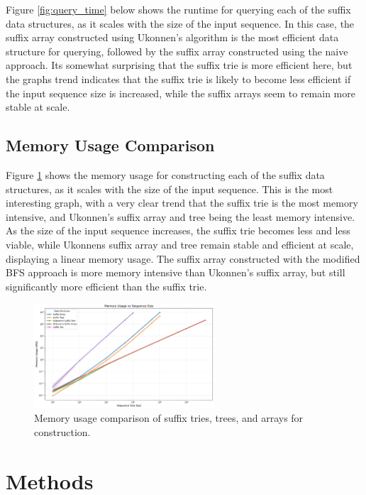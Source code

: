 \documentclass[11pt, letterpaper]{article}
\begin{document}
Figure \ref{fig:query_time} below shows the runtime for querying each of the suffix data structures, as it scales with the size of the input sequence.
In this case, the suffix array constructed using Ukonnen's algorithm is the most efficient data structure for querying, followed by the suffix array constructed using the naive approach.
Its somewhat surprising that the suffix trie is more efficient here, but the graphs trend indicates that the suffix trie is likely to become less efficient if the input sequence size is increased,
while the suffix arrays seem to remain more stable at scale.

\subsection{Memory Usage Comparison}

Figure \ref{fig:memory_usage} shows the memory usage for constructing each of the suffix data structures, as it scales with the size of the input sequence.
This is the most interesting graph, with a very clear trend that the suffix trie is the most memory intensive, and Ukonnen's suffix array and tree being the least memory intensive.
As the size of the input sequence increases, the suffix trie becomes less and less viable, while Ukonnens suffix array and tree remain stable and efficient at scale, displaying a linear memory usage.
The suffix array constructed with the modified BFS approach is more memory intensive than Ukonnen's suffix array, but still significantly more efficient than the suffix trie.

\begin{figure}[ht]
  \centering
  \includegraphics[width=0.6\textwidth]{../figures/memory_usage.png}
  \caption{Memory usage comparison of suffix tries, trees, and arrays for construction.}
  \label{fig:memory_usage}
\end{figure}

\section{Methods}
\end{document}
